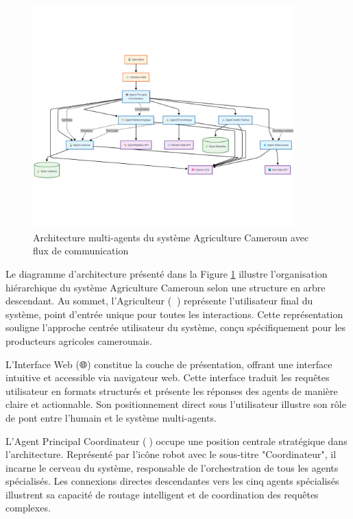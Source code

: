 \begin{figure}[H]
\centering
\includegraphics[width=0.9\textwidth]{images/architectures.png}
\caption{Architecture multi-agents du système Agriculture Cameroun avec flux de communication}
\label{fig:architecture}
\end{figure}

Le diagramme d'architecture présenté dans la Figure \ref{fig:architecture} illustre l'organisation hiérarchique du système Agriculture Cameroun selon une structure en arbre descendant. Au sommet, l'Agriculteur (👨‍🌾) représente l'utilisateur final du système, point d'entrée unique pour toutes les interactions. Cette représentation souligne l'approche centrée utilisateur du système, conçu spécifiquement pour les producteurs agricoles camerounais.

L'Interface Web (🌐) constitue la couche de présentation, offrant une interface intuitive et accessible via navigateur web. Cette interface traduit les requêtes utilisateur en formats structurés et présente les réponses des agents de manière claire et actionnable. Son positionnement direct sous l'utilisateur illustre son rôle de pont entre l'humain et le système multi-agents.

L'Agent Principal Coordinateur (🤖) occupe une position centrale stratégique dans l'architecture. Représenté par l'icône robot avec le sous-titre "Coordinateur", il incarne le cerveau du système, responsable de l'orchestration de tous les agents spécialisés. Les connexions directes descendantes vers les cinq agents spécialisés illustrent sa capacité de routage intelligent et de coordination des requêtes complexes.

